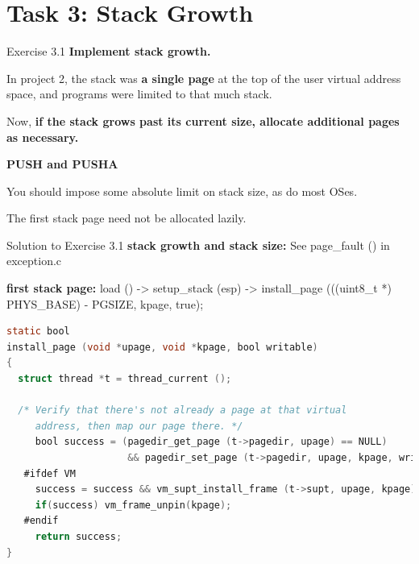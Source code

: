 \documentclass[10pt]{beamer}
\begin{document}
\section{Task 3: Stack Growth}
\begin{frame}[fragile]{Exercise 3.1}
\textbf{Implement stack growth.}

In project 2, the stack was \textbf{a single page} at the top of the user virtual address space, and programs were limited to that much stack.

Now, \textbf{if the stack grows past its current size, allocate additional pages as necessary.}

\textbf{PUSH and PUSHA}

You should impose some absolute limit on stack size, as do most OSes. 

The first stack page need not be allocated lazily.
\end{frame}
\begin{frame}[fragile]{Solution to Exercise 3.1}
    \textbf{stack growth and stack size:} See page\_fault () in exception.c

    \textbf{first stack page:}
    load () -> setup\_stack (esp) -> install\_page (((uint8\_t *) PHYS\_BASE) - PGSIZE, kpage, true);
\begin{lstlisting}[language=C]
static bool
install_page (void *upage, void *kpage, bool writable)
{
  struct thread *t = thread_current ();

  /* Verify that there's not already a page at that virtual
     address, then map our page there. */
     bool success = (pagedir_get_page (t->pagedir, upage) == NULL)
                     && pagedir_set_page (t->pagedir, upage, kpage, writable);
   #ifdef VM
     success = success && vm_supt_install_frame (t->supt, upage, kpage);
     if(success) vm_frame_unpin(kpage);
   #endif
     return success;
}
\end{lstlisting}
\end{frame}
\end{document}
